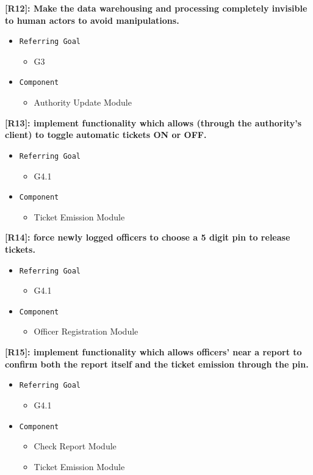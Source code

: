 \documentclass[12pt,a4paper]{article}
\begin{document}
\textbf{[R12]: Make the data warehousing and processing completely invisible to human actors to avoid manipulations.}
\begin{itemize}
	\item \texttt{Referring Goal}
	\begin{itemize}
		\item G3
	\end{itemize}
	\item \texttt{Component}
	\begin{itemize}
		\item Authority Update Module
	\end{itemize}
\end{itemize}
\textbf{[R13]: implement functionality which allows (through the authority's client) to toggle automatic tickets ON or OFF.}
\begin{itemize}
	\item \texttt{Referring Goal}
	\begin{itemize}
		\item G4.1
	\end{itemize}
	\item \texttt{Component}
	\begin{itemize}
		\item Ticket Emission Module
	\end{itemize}
\end{itemize}
\textbf{[R14]: force newly logged officers to choose a 5 digit pin to release tickets.}
\begin{itemize}
	\item \texttt{Referring Goal}
	\begin{itemize}
		\item G4.1
	\end{itemize}
	\item \texttt{Component}
	\begin{itemize}
		\item Officer Registration Module
	\end{itemize}
\end{itemize}
\textbf{[R15]: implement functionality which allows officers' near a report to confirm both the report itself and the ticket emission through the pin.}
\begin{itemize}
	\item \texttt{Referring Goal}
	\begin{itemize}
		\item G4.1
	\end{itemize}
	\item \texttt{Component}
	\begin{itemize}
		\item Check Report Module
		\item Ticket Emission Module
	\end{itemize}
\end{itemize}
\end{document}
